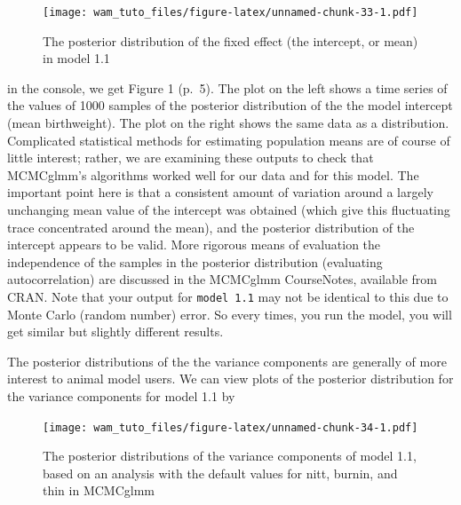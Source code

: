\documentclass[
  12pt,
]{book}
\newenvironment{Shaded}{\begin{snugshade}}{\end{snugshade}}
\newcommand{\FloatTok}[1]{\textcolor[rgb]{0.00,0.00,0.81}{#1}}
\newcommand{\KeywordTok}[1]{\textcolor[rgb]{0.13,0.29,0.53}{\textbf{#1}}}
\newcommand{\NormalTok}[1]{#1}
\newcommand{\OperatorTok}[1]{\textcolor[rgb]{0.81,0.36,0.00}{\textbf{#1}}}
\begin{document}
\begin{Shaded}
\end{Shaded}

\begin{figure}
\centering
\texttt{[image: wam\_tuto\_files/figure-latex/unnamed-chunk-33-1.pdf]}
\caption{\label{fig:unnamed-chunk-33}The posterior distribution of the fixed effect (the intercept, or mean) in model 1.1}
\end{figure}

in the console, we get Figure 1 (p.~5). The plot on the left shows a time series of the values of 1000 samples of the posterior distribution of the the model intercept (mean birthweight). The plot on the right shows the same data as a distribution. Complicated statistical methods for estimating population means are of course of little interest; rather, we are examining these outputs to check that MCMCglmm's algorithms worked well for our data and for this model. The important point here is that a consistent amount of variation around a largely unchanging mean value of the intercept was obtained (which give this fluctuating trace concentrated around the mean), and the posterior distribution of the intercept appears to be valid. More rigorous means of evaluation the independence of the samples in the posterior distribution (evaluating autocorrelation) are discussed in the MCMCglmm CourseNotes, available from CRAN. Note that your output for \texttt{model\ 1.1} may not be identical to this due to Monte Carlo (random number) error. So every times, you run the model, you will get similar but slightly different results.

The posterior distributions of the the variance components are generally of more interest to animal model users. We can view plots of the posterior distribution for the variance components for model 1.1 by

\begin{Shaded}
\end{Shaded}

\begin{figure}
\centering
\texttt{[image: wam\_tuto\_files/figure-latex/unnamed-chunk-34-1.pdf]}
\caption{\label{fig:unnamed-chunk-34}The posterior distributions of the variance components of model 1.1, based on an analysis with the default values for nitt, burnin, and thin in MCMCglmm}
\end{figure}
\end{document}
